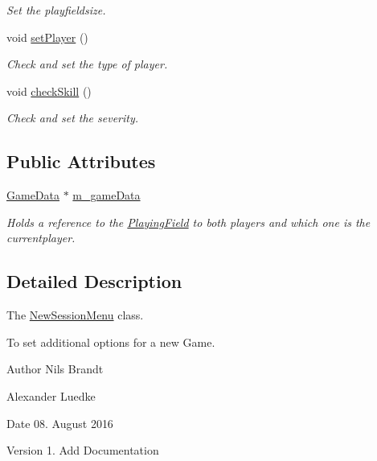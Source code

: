 \begin{DoxyCompactItemize}
\begin{DoxyCompactList}\small\item\em Set the playfieldsize. \end{DoxyCompactList}\item 
\hypertarget{classNewSessionMenu_ac13a0674e7492b42279b60e8b73fb561}{void \hyperlink{classNewSessionMenu_ac13a0674e7492b42279b60e8b73fb561}{set\-Player} ()}\label{classNewSessionMenu_ac13a0674e7492b42279b60e8b73fb561}

\begin{DoxyCompactList}\small\item\em Check and set the type of player. \end{DoxyCompactList}\item 
\hypertarget{classNewSessionMenu_a0985b4cc0908c662788f68dd55b38472}{void \hyperlink{classNewSessionMenu_a0985b4cc0908c662788f68dd55b38472}{check\-Skill} ()}\label{classNewSessionMenu_a0985b4cc0908c662788f68dd55b38472}

\begin{DoxyCompactList}\small\item\em Check and set the severity. \end{DoxyCompactList}\end{DoxyCompactItemize}
\subsection*{Public Attributes}
\begin{DoxyCompactItemize}
\item 
\hyperlink{classGameData}{Game\-Data} $\ast$ \hyperlink{classNewSessionMenu_a1e5fc5bfe12c63b0f99df1dc3ffec0ba}{m\-\_\-game\-Data}
\begin{DoxyCompactList}\small\item\em Holds a reference to the \hyperlink{classPlayingField}{Playing\-Field} to both players and which one is the currentplayer. \end{DoxyCompactList}\end{DoxyCompactItemize}


\subsection{Detailed Description}
The \hyperlink{classNewSessionMenu}{New\-Session\-Menu} class. 

To set additional options for a new Game.

\begin{DoxyAuthor}{Author}
Nils Brandt 

Alexander Luedke
\end{DoxyAuthor}
\begin{DoxyDate}{Date}
08. August 2016
\end{DoxyDate}
\begin{DoxyVersion}{Version}
1. Add Documentation 
\end{DoxyVersion}


